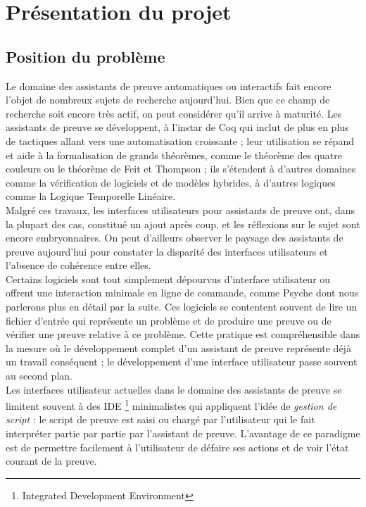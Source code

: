 \section{Présentation du projet}

\subsection{Position du problème}

Le domaine des assistants de preuve automatiques ou interactifs fait encore l'objet de nombreux sujets de recherche aujourd'hui. Bien que ce champ de recherche soit encore très actif, on peut considérer qu'il arrive à maturité. Les assistants de preuve se développent, à l'instar de Coq qui inclut de plus en plus de tactiques allant vers une automatisation croissante ; leur utilisation se répand et aide à la formalisation de grands théorèmes, comme le théorème des quatre couleurs ou le théorème de Feit et Thompson ; ils s'étendent à d'autres domaines comme la vérification de logiciels et de modèles hybrides, à d'autres logiques comme la Logique Temporelle Linéaire.\\

Malgré ces travaux, les interfaces utilisateurs pour assistants de preuve ont, dans la plupart des cas, constitué un ajout après coup, et les réflexions sur le sujet sont encore embryonnaires. On peut d'ailleurs observer le paysage des assistants de preuve aujourd'hui pour constater la disparité des interfaces utilisateurs et l'absence de cohérence entre elles.\\

Certains logiciels sont tout simplement dépourvus d'interface utilisateur ou offrent une interaction minimale en ligne de commande, comme Psyche dont nous parlerons plus en détail par la suite. Ces logiciels se contentent souvent de lire un fichier d'entrée qui représente un problème et de produire une preuve ou de vérifier une preuve relative à ce problème. Cette pratique est compréhensible dans la mesure où le développement complet d'un assistant de preuve représente déjà un travail conséquent ; le développement d'une interface utilisateur passe souvent au second plan.\\

Les interfaces utilisateur actuelles dans le domaine des assistants de preuve se limitent souvent à des IDE \footnote{Integrated Development Environment} minimalistes qui appliquent l'idée de \textit{gestion de script} : le script de preuve est saisi ou chargé par l'utilisateur qui le fait interpréter partie par partie par l'assistant de preuve. L'avantage de ce paradigme est de permettre facilement à l'utilisateur de défaire ses actions et de voir l'état courant de la preuve.\\


